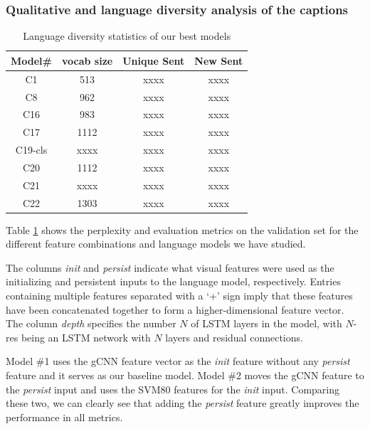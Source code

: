 \subsubsection{Qualitative and language diversity analysis of the captions}
\begin{table}[htp]
  \centering
  \newcommand{\bs}{\small}
  \begin{adjustbox}{center}
  \begin{tabular}{|c|c|c|c|}
    \hline
    \bf Model\# &\bf vocab size & Unique Sent & New Sent \\\hline\hline
    C1      & 513  & xxxx & xxxx  \\
    C8      & 962  & xxxx & xxxx  \\
    C16     & 983  & xxxx & xxxx  \\
    C17     & 1112 & xxxx & xxxx  \\
    C19-cls & xxxx & xxxx & xxxx  \\
    C20     & 1112 & xxxx & xxxx  \\
    C21     & xxxx & xxxx & xxxx  \\
    C22     & 1303 & xxxx & xxxx  \\\hline
  \end{tabular}
  \end{adjustbox}
  \caption{Language diversity statistics of our best models }
  \label{tab:resultsVal}
\end{table}


Table \ref{tab:resultsVal} shows the perplexity and evaluation metrics on the
validation set for the different feature combinations and language models we
have studied.

The columns \emph{init} and \emph{persist} indicate what visual features were
used as the initializing and persistent inputs to the language model,
respectively.
Entries containing multiple features separated with a `+' sign imply that these
features have been concatenated together to form a higher-dimensional feature
vector.
The column \emph{depth} specifies the number $N$ of LSTM layers in the model,
with $N$-res being an LSTM network with $N$ layers and residual connections.

Model \#1 uses the gCNN feature vector as the \emph{init} feature without any
\emph{persist} feature and it serves as our baseline model.
Model \#2 moves the gCNN feature to the \emph{persist} input and uses the SVM80
features for the \emph{init} input. 
Comparing these two, we can clearly see that adding the \emph{persist} feature
greatly improves the performance in all metrics.


